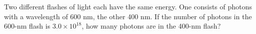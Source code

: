 Two different flashes of light each have the same energy.
One consists of photons with a wavelength of 600 nm, the other
400 nm. If the number of photons in the 600-nm flash is
$3.0\times10^{18}$, how many photons are in the 400-nm flash?\answercheck\hwendpart
